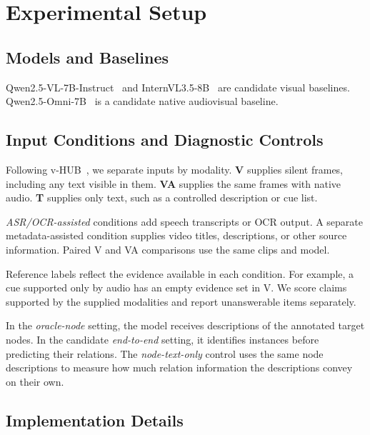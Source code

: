 \section{Experimental Setup}
\label{sec:experiments}

\subsection{Models and Baselines}
Qwen2.5-VL-7B-Instruct~\citep{bai2025qwen25vl} and InternVL3.5-8B~\citep{wang2025internvl35} are candidate visual baselines.
Qwen2.5-Omni-7B~\citep{xu2025qwen25omni} is a candidate native audiovisual baseline.

\subsection{Input Conditions and Diagnostic Controls}
Following v-HUB~\citep{shi2025vhub}, we separate inputs by modality.
\textbf{V} supplies silent frames, including any text visible in them.
\textbf{VA} supplies the same frames with native audio.
\textbf{T} supplies only text, such as a controlled description or cue list.

\emph{ASR/OCR-assisted} conditions add speech transcripts or OCR output.
A separate metadata-assisted condition supplies video titles, descriptions, or other source information.
Paired V and VA comparisons use the same clips and model.

Reference labels reflect the evidence available in each condition.
For example, a cue supported only by audio has an empty evidence set in V.
We score claims supported by the supplied modalities and report unanswerable items separately.

In the \emph{oracle-node} setting, the model receives descriptions of the annotated target nodes.
In the candidate \emph{end-to-end} setting, it identifies instances before predicting their relations.
The \emph{node-text-only} control uses the same node descriptions to measure how much relation information the descriptions convey on their own.

\subsection{Implementation Details}
